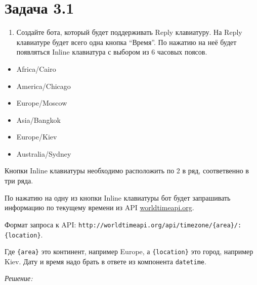 \documentclass[
]{book}
\providecommand{\tightlist}{%
  \setlength{\itemsep}{0pt}\setlength{\parskip}{0pt}}
\begin{document}
\hypertarget{ux437ux430ux434ux430ux447ux430-3.1}{%
\section*{Задача 3.1}\label{ux437ux430ux434ux430ux447ux430-3.1}}

\begin{enumerate}
\def\labelenumi{\arabic{enumi}.}
\tightlist
\item
  Создайте бота, который будет поддерживать Reply клавиатуру. На Reply клавиатуре будет всего одна кнопка ``Время''. По нажатию на неё будет появляться Inline клавиатура с выбором из 6 часовых поясов.
\end{enumerate}

\begin{itemize}
\tightlist
\item
  Africa/Cairo
\item
  America/Chicago
\item
  Europe/Moscow
\item
  Asia/Bangkok
\item
  Europe/Kiev
\item
  Australia/Sydney
\end{itemize}

Кнопки Inline клавиатуры необходимо расположить по 2 в ряд, соответвенно в три ряда.

По нажатию на одну из кнопки Inline клавиатуры бот будет запрашивать информацию по текущему времени из API \href{http://worldtimeapi.org/}{worldtimeapi.org}.

Формат запроса к API: \texttt{http://worldtimeapi.org/api/timezone/\{area\}/:\{location\}}.

Где \texttt{\{area\}} это континент, например Europe, а \texttt{\{location\}} это город, например Kiev. Дату и время надо брать в ответе из компонента \texttt{datetime}.

\emph{Решение:}
\end{document}
